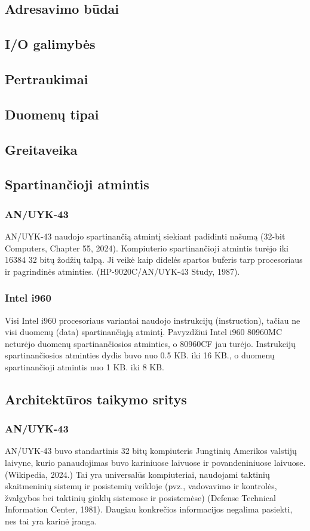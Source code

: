 \documentclass{article}
\begin{document}
\subsection{Adresavimo būdai}
\subsection{I/O galimybės}
\subsection{Pertraukimai}
\subsection{Duomenų tipai}
\subsection{Greitaveika}
\subsection{Spartinančioji atmintis}
\subsubsection{AN/UYK-43}
AN/UYK-43 naudojo spartinančią atmintį siekiant padidinti našumą (32-bit Computers, Chapter 55, 2024). Kompiuterio spartinančioji atmintis turėjo iki 16384 32 bitų žodžių talpą. Ji veikė kaip didelės spartos buferis tarp procesoriaus ir pagrindinės atminties. (HP-9020C/AN/UYK-43 Study, 1987).
\subsubsection{Intel i960}
Visi Intel i960 procesoriaus variantai naudojo instrukcijų (instruction), tačiau ne visi duomenų (data) spartinančiąją atmintį. Pavyzdžiui Intel i960 80960MC neturėjo duomenų spartinančiosios atminties, o 80960CF jau turėjo. Instrukcijų spartinančiosios atminties dydis buvo nuo 0.5 KB. iki 16 KB., o duomenų spartinančioji atmintis nuo 1 KB. iki 8 KB.
\subsection{Architektūros taikymo sritys}
\subsubsection{AN/UYK-43}
AN/UYK-43 buvo standartinis 32 bitų kompiuteris Jungtinių Amerikos valstijų laivyne, kurio panaudojimas buvo kariniuose laivuose ir povandeniniuose laivuose. (Wikipedia, 2024.) Tai yra universalūs kompiuteriai, naudojami taktinių skaitmeninių sistemų ir posistemių veikloje (pvz., vadovavimo ir kontrolės, žvalgybos bei taktinių ginklų sistemose ir posistemėse) (Defense Technical Information Center, 1981). Daugiau konkrečios informacijos negalima pasiekti, nes tai yra karinė įranga.
\end{document}
